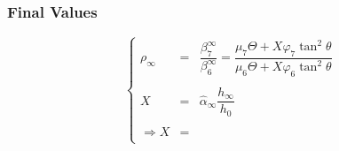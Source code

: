\documentclass[aps,onecolumn,12pt]{revtex4}
\begin{document}
\subsubsection{Final Values}
\begin{equation}
\left\lbrace
\begin{array}{rcl}
	\rho_\infty & = &  \dfrac{\beta_7^\infty}{\beta_6^\infty} = \dfrac{\mu_7 \Theta + X \varphi_7 \tan^2\theta}{\mu_6 \Theta + X \varphi_6 \tan^2\theta} \\
	\\
	X & = & \hat\alpha_\infty \dfrac{h_\infty}{h_0}\\
	\\
	\Rightarrow	X & = & \\
\end{array}
\right.
\end{equation}
\end{document}
